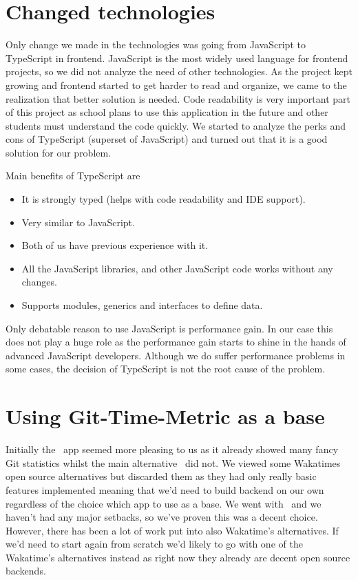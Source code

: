 \section{Changed technologies}\label{sec:changed-technologies}
Only change we made in the technologies was going from JavaScript to TypeScript in frontend.
JavaScript is the most widely used language for frontend projects, so we did not analyze the need of other technologies.
As the project kept growing and frontend started to get harder to read and organize, we came to the realization that better solution is needed.
Code readability is very important part of this project as school plans to use this application in the future and other students must understand the code quickly.
We started to analyze the perks and cons of TypeScript (superset of JavaScript) and turned out that it is a good solution for our problem.

Main benefits of TypeScript are
\begin{itemize}
    \item It is strongly typed (helps with code readability and IDE support).
    \item Very similar to JavaScript.
    \item Both of us have previous experience with it.
    \item All the JavaScript libraries, and other JavaScript code works without any changes.
    \item Supports modules, generics and interfaces to define data.
\end{itemize}

Only debatable reason to use JavaScript is performance gain.
In our case this does not play a huge role as the performance gain starts to shine in the hands of advanced JavaScript developers.
Although we do suffer performance problems in some cases, the decision of TypeScript is not the root cause of the problem.

\section{Using Git-Time-Metric as a base}\label{sec:using-git-time-metric-base}
Initially the~ app seemed more pleasing to us as it already showed many fancy Git statistics whilst
the main alternative~ did not.
We viewed some Wakatimes open source alternatives but discarded them as they had only really basic features implemented meaning that
we'd need to build backend on our own regardless of the choice which app to use as a base.
We went with~ and we haven't had any major setbacks, so we've proven this was a decent choice.
However, there has been a lot of work put into also Wakatime's alternatives.
If we'd need to start again from scratch we'd likely to go with one of the Wakatime's alternatives instead as right now
they already are decent open source backends.

